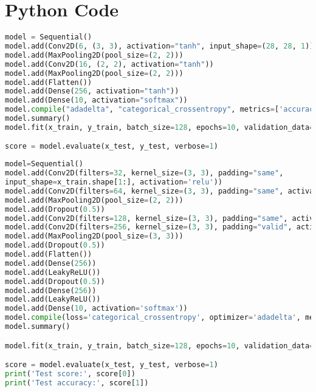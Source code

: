 \chapter{Python Code}
\begin{lstlisting}[language=Python,label={code:lenet},caption={LeNet code}]
model = Sequential()
model.add(Conv2D(6, (3, 3), activation="tanh", input_shape=(28, 28, 1)))
model.add(MaxPooling2D(pool_size=(2, 2)))
model.add(Conv2D(16, (2, 2), activation="tanh"))
model.add(MaxPooling2D(pool_size=(2, 2)))
model.add(Flatten())
model.add(Dense(256, activation="tanh"))
model.add(Dense(10, activation="softmax"))
model.compile("adadelta", "categorical_crossentropy", metrics=['accuracy'])
model.summary()
model.fit(x_train, y_train, batch_size=128, epochs=10, validation_data=(x_test, y_test))

score = model.evaluate(x_test, y_test, verbose=1)
\end{lstlisting}

\begin{lstlisting}[language=Python,label={code:vggnet},caption={VGG-like Net Code}]
model=Sequential()
model.add(Conv2D(filters=32, kernel_size=(3, 3), padding="same", 
input_shape=x_train.shape[1:], activation='relu'))
model.add(Conv2D(filters=64, kernel_size=(3, 3), padding="same", activation='relu'))
model.add(MaxPooling2D(pool_size=(2, 2)))
model.add(Dropout(0.5))
model.add(Conv2D(filters=128, kernel_size=(3, 3), padding="same", activation='relu'))
model.add(Conv2D(filters=256, kernel_size=(3, 3), padding="valid", activation='relu'))
model.add(MaxPooling2D(pool_size=(3, 3)))
model.add(Dropout(0.5))
model.add(Flatten())
model.add(Dense(256))
model.add(LeakyReLU())
model.add(Dropout(0.5))
model.add(Dense(256))
model.add(LeakyReLU())
model.add(Dense(10, activation='softmax'))
model.compile(loss='categorical_crossentropy', optimizer='adadelta', metrics=['accuracy'])
model.summary()

model.fit(x_train, y_train, batch_size=128, epochs=10, validation_data=(x_test, y_test))

score = model.evaluate(x_test, y_test, verbose=1)
print('Test score:', score[0])
print('Test accuracy:', score[1])
\end{lstlisting}

